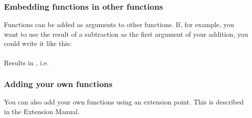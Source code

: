 \subsubsection{Embedding functions in other functions}
Functions can be added as arguments to other functions. If, for example, you want to use the result of a subtraction as the first argument of your addition, you could write it like this:\\
\\
Results in , i.e. \\


\subsubsection{Adding your own functions}
You can also add your own functions using an extension point. This is described in the Extension Manual. 




